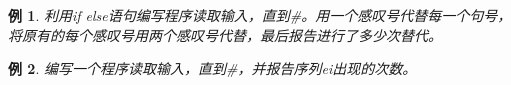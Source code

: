 \documentclass[12pt,notheorems]{beamer}
\newtheorem{li}{例}
\begin{document}
\begin{frame}

\end{frame}


\begin{frame}[fragile]
\begin{li}
利用if else语句编写程序读取输入，直到\#。用一个感叹号代替每一个句号，将原有的每个感叹号用两个感叹号代替，最后报告进行了多少次替代。
\end{li}
\end{frame}

\begin{frame}

\end{frame}


\begin{frame}[fragile]
\begin{li}
编写一个程序读取输入，直到\#，并报告序列ei出现的次数。
\end{li}
\end{frame}
\end{document}

